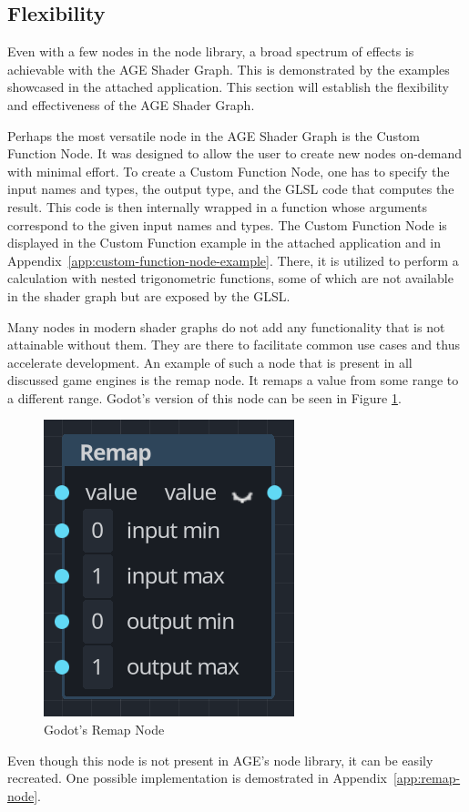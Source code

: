 \documentclass[
  digital,     %
  oneside,     %
  nosansbold,  %
  nocolorbold, %
  lof,         %
  lot,         %
]{fithesis4}
\begin{document}
\subsection{Flexibility}\label{sec:flexibility}
Even with a few nodes in the node library, a broad spectrum of effects
is achievable with the AGE Shader Graph. This is demonstrated by the examples showcased
in the attached application. This section will establish the flexibility and effectiveness of
the AGE Shader Graph.

Perhaps the most versatile node in the AGE Shader Graph is the Custom Function Node.
It was designed to allow the user to create
new nodes on-demand with minimal effort. To create a Custom Function Node,
one has to specify the input names and types, the output type,
and the GLSL code that computes the result. This code is then internally wrapped in a function
whose arguments correspond to the given input names and types.
The Custom Function Node is displayed in the Custom Function example in the attached application
and in Appendix~\ref{app:custom-function-node-example}.
There, it is utilized to perform a calculation with nested trigonometric functions,
some of which are not available in the shader graph but are exposed by the GLSL.

Many nodes in modern shader graphs do not add any functionality that is not
attainable without them. They are there to facilitate common use cases
and thus accelerate development. An example of such a node that is present
in all discussed game engines is the remap node. It remaps a value
from some range to a different range. Godot's version of this node can be seen in Figure \ref{fig:godot-remap-node}.
\begin{figure}[H]
    \centering
    \includegraphics[height=0.3\textwidth]{images/godot_remap_node.png}
    \caption{Godot's Remap Node}
    \label{fig:godot-remap-node}
\end{figure}

Even though this node is not present in AGE's node library, it can be easily recreated.
One possible implementation is demostrated in Appendix~\ref{app:remap-node}.
\end{document}
